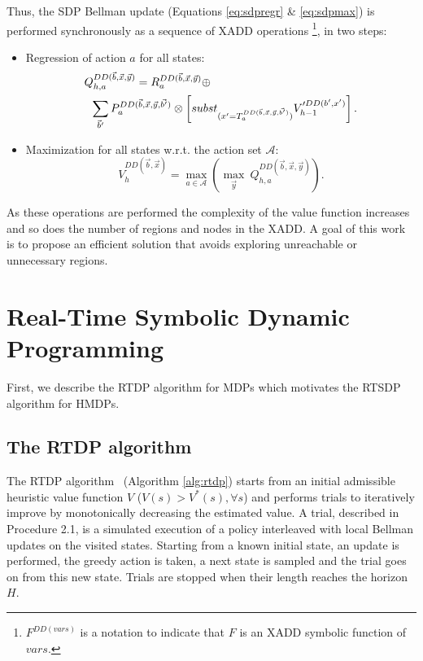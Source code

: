 \documentclass[letterpaper]{article}
\begin{document}
Thus, the SDP Bellman update (Equations \ref{eq:sdpregr} \& \ref{eq:sdpmax}) is performed synchronously as a sequence of XADD operations \footnote{$F^{DD(vars)}$ is a notation to indicate that $F$ is an XADD symbolic function of $vars$.}, in two steps:
\begin{itemize}
\item {Regression of action $a$ for all states:
{\small
\begin{align}
Q_{h,a}^{DD(\vec{b},\vec{x},\vec{y})} & =  R_a^{DD(\vec{b},\vec{x},\vec{y})} \oplus \nonumber \\
	& \hspace{-1.4cm}  \sum_{\vec{b}'}  P_a^{DD(\vec{b},\vec{x},\vec{y},\vec{b'})} \otimes \left[ subst_{(x' = T_a^{DD(\vec{b},\vec{x},\vec{y},\vec{b'})})} V_{h-1}'^{DD(b',x')} \right]. 
\label{eq:SDPregrDD}
\end{align}
}
}
\item{
Maximization for all states w.r.t. the action set $\mathcal{A}$:
\begin{equation}
V_h^{DD(\vec{b},\vec{x})} = \max_{a\in\mathcal{A}} \left( \max_{\vec{y}}~ Q_{h,a}^{DD(\vec{b},\vec{x},\vec{y})} \right).
\label{eq:SDPmaxDD}
\end{equation}
}
\end{itemize}

As these operations are performed the complexity of the value function increases and so does the number of regions and nodes in the XADD. A goal of this work is to propose an efficient solution that avoids exploring unreachable or unnecessary regions.

\section{Real-Time Symbolic Dynamic Programming}

First, we describe the RTDP algorithm for MDPs which motivates the RTSDP algorithm for HMDPs.

\subsection{The RTDP algorithm}

The RTDP algorithm~\cite{Barto95RTDP} (Algorithm \ref{alg:rtdp}) starts from an initial admissible heuristic value function $V$ ($V(s) > V^*(s), \forall s$) and performs trials to iteratively improve by monotonically decreasing the estimated value. A trial, described in Procedure 2.1, is a simulated execution of a policy interleaved with local Bellman updates on the visited states.
Starting from a known initial state, an update is performed, the greedy action is taken, a next state is sampled and the trial goes on from this new state. Trials are stopped when their length reaches the horizon $H$.
\end{document}
